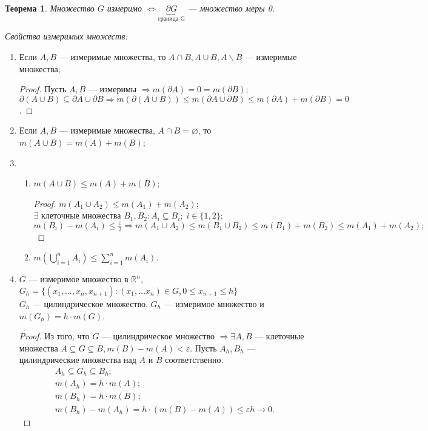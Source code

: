 \documentclass[a4paper,12pt]{article}
\let\emptyset\varnothing
\newtheorem*{theorem}{Теорема}
\theoremstyle{remark}
\theoremstyle{definition}
\begin{document}
\begin{theorem}
    Множество \(G\) измеримо \(\Leftrightarrow \underbrace{\partial G}_{\text{граница G}}\) --- множество меры 0.
\end{theorem}

\emph{Свойства измеримых множеств:}

\begin{enumerate}
    \item Если \(A, B\) --- измеримые множества, то \(A \cap B, A \cup B, A \backslash B\) --- измеримые множества;
    \begin{proof}
        Пусть \(A, B\) --- измеримы \(\Rightarrow m(\partial A) = 0 = m(\partial B)\); \(\partial(A \cup B) \subseteq \partial A \cup \partial B \Rightarrow m(\partial(A \cup B)) \leqslant m(\partial A \cup \partial B) \leqslant m(\partial A) + m(\partial B) = 0\).
    \end{proof}
    \item Если \(A, B\) --- измеримые множества, \(A \cap B = \emptyset\), то \(m(A \cup B) = m(A) + m(B)\);
    \item
    \begin{enumerate}
        \item \(m(A \cup B) \leqslant m(A) + m(B)\);
        \begin{proof}
            \(m(A_1 \cup A_2) \leqslant m(A_1) + m(A_2)\); \\
            \(\exists\) клеточные множества \(B_1, B_2: A_i \subseteq B_i;\; i \in \{1,2\};\)
            \(m(B_i) - m(A_i) \leqslant \frac{\varepsilon}{2} \Rightarrow m(A_1 \cup A_2) \leqslant m(B_1 \cup B_2) \leqslant m(B_1) + m(B_2) \leqslant m(A_1) + m(A_2);\)
        \end{proof}
        \item \(m\left(\bigcup_{i=1}^n A_i\right) \leqslant \sum_{i=1}^n m(A_i)\).
    \end{enumerate}
    \item \(G\) --- измеримое множество в \(\mathbb{R}^n\), \\
    \(G_h = \{(x_1, \ldots, x_n, x_{n+1}): (x_1, \ldots x_n) \in G, 0 \leqslant x_{n+1} \leqslant h\}\) \\
    \(G_h\) --- цилиндрическое множество. \(G_h\) --- измеримое множество и \(m(G_h) = h \cdot m(G)\).
    \begin{proof}
        Из того, что \(G\) --- цилиндрическое множество \(\Rightarrow \exists A, B\) --- клеточные множества \(A \subseteq G \subseteq B, m(B) - m(A) < \varepsilon\). Пусть \(A_h, B_h\) --- цилиндрические множества над \(A\) и \(B\) соответственно.
        \begin{gather*}
            A_h \subseteq G_h \subseteq B_h; \\
            m(A_h) = h \cdot m(A); \\
            m(B_h) = h \cdot m(B); \\
            m(B_h) - m(A_h) = h \cdot (m(B) - m(A)) \leqslant \varepsilon h \rightarrow 0.
        \end{gather*}
    \end{proof}
\end{enumerate}
\end{document}
